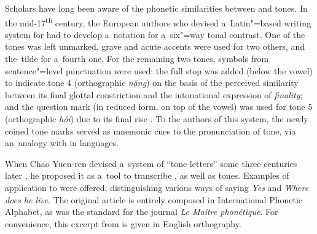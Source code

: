 Scholars have long been aware of the phonetic similarities between  and tones. In the mid-17\textsuperscript{th} century, the European authors who devised a~Latin"=based
writing system for  \citep{derhodes1651} had to develop a~notation for a~six"=way tonal
contrast. One of the tones was left unmarked, grave and acute accents were used for two others, and
the~tilde for a~fourth one. For the remaining two tones, symbols from sentence"=level punctuation were
used: the full stop was added (below the vowel) to indicate tone 4 (orthographic \textit{nặng}) on
the basis of the perceived similarity between its final glottal constriction and the intonational
expression of \textit{finality}; and the {question} mark (in reduced form, on top of the vowel) was
used for tone 5 (orthographic \textit{hỏi}) due to its final rise
\citep{haudricourt2010b}. To the authors of this system, the newly coined tone marks served as mnemonic
cues to the pronunciation of tone, via an~{analogy} with  in  languages. 

When Chao Yuen-ren devised a~system of “tone-letters” some three centuries later \citep{chao1930}, he proposed it as a~tool to transcribe , as well as tones. Examples of application to   were offered, distinguishing various ways of saying \textit{Yes} and \textit{Where does he live}.
The original article is entirely composed in International Phonetic Alphabet, as was the standard for the journal \textit{Le Maître phonétique}. For convenience, this excerpt from \citet[26]{chao1930} is given in {English} orthography.


